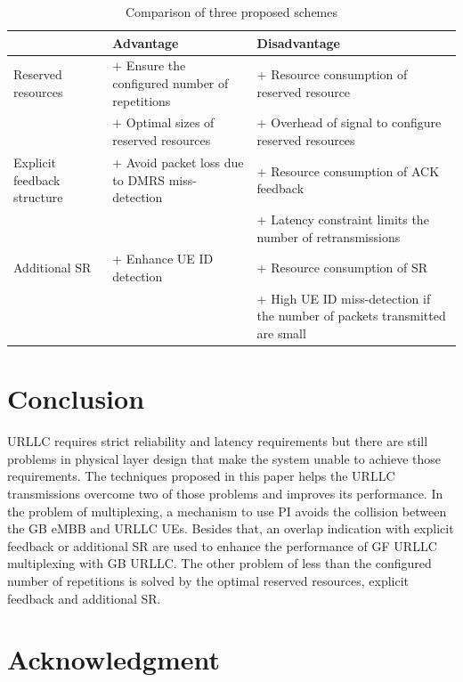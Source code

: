 \documentclass{ieeeaccess}
\begin{document}
\begin{table}[htbp]
\caption{Comparison of three proposed schemes}
\begin{center}
\begin{tabular}{|p{4em}|p{11em}|p{11em}|}
 \hline
& \textbf{Advantage}&\textbf{Disadvantage}\\
 \hline
 Reserved resources &+ Ensure the configured number of repetitions & + Resource consumption of reserved resource\\ & + Optimal sizes of reserved resources &+ Overhead of signal to configure reserved resources\\
 \hline
  Explicit feedback structure& + Avoid packet loss due to DMRS miss-detection&+ Resource consumption of ACK feedback\\& &+ Latency constraint limits the number of retransmissions\\
 \hline
Additional SR&+ Enhance UE ID detection&+ Resource consumption of SR\\& &  + High UE ID miss-detection if the number of packets transmitted are small\\

 
 \hline
\end{tabular}
\label{tab9}
\end{center}

\end{table}

\section{Conclusion}

URLLC requires strict reliability and latency requirements but there are still problems in physical layer design that make the system unable to achieve those requirements. The techniques proposed in this paper helps the URLLC transmissions overcome two of those problems and improves its performance. In the problem of multiplexing, a mechanism to use PI avoids the collision between the GB eMBB and URLLC UEs. Besides that, an overlap indication with explicit feedback or additional SR are used to enhance the performance of GF URLLC multiplexing with GB URLLC. The other problem of less than the configured number of repetitions is solved by the optimal reserved resources, explicit feedback and additional SR.

\section*{Acknowledgment}
\end{document}
